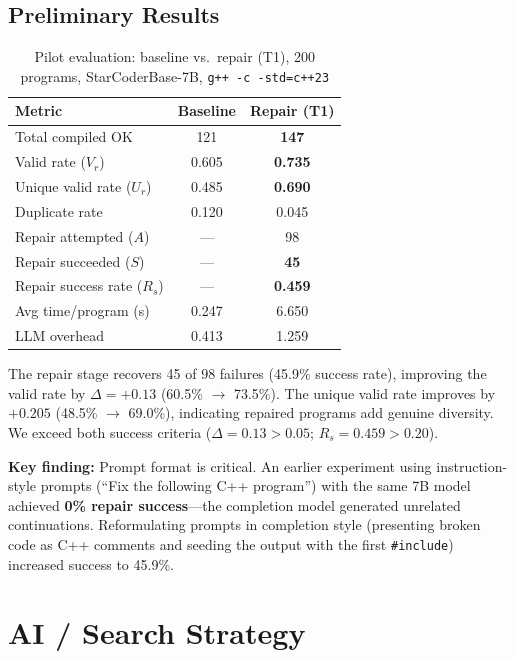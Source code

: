 \documentclass[conference]{IEEEtran}
\begin{document}
\subsection{Preliminary Results}
\label{sec:prelim}

\begin{table}[t]
\centering
\caption{Pilot evaluation: baseline vs.\ repair (T1), 200 programs, StarCoderBase-7B, \texttt{g++ -c -std=c++23}}
\label{tab:main_results}
\begin{tabular}{lcc}
\toprule
\textbf{Metric} & \textbf{Baseline} & \textbf{Repair (T1)} \\
\midrule
Total compiled OK & 121 & \textbf{147} \\
Valid rate ($V_r$) & 0.605 & \textbf{0.735} \\
Unique valid rate ($U_r$) & 0.485 & \textbf{0.690} \\
Duplicate rate & 0.120 & 0.045 \\
\midrule
Repair attempted ($A$) & --- & 98 \\
Repair succeeded ($S$) & --- & \textbf{45} \\
Repair success rate ($R_s$) & --- & \textbf{0.459} \\
\midrule
Avg time/program (s) & 0.247 & 6.650 \\
LLM overhead & 0.413 & 1.259 \\
\bottomrule
\end{tabular}
\end{table}

The repair stage recovers 45 of 98 failures (45.9\% success rate), improving the valid rate by $\Delta = +0.13$ (60.5\% $\to$ 73.5\%). The unique valid rate improves by $+0.205$ (48.5\% $\to$ 69.0\%), indicating repaired programs add genuine diversity. We exceed both success criteria ($\Delta = 0.13 > 0.05$; $R_s = 0.459 > 0.20$).

\textbf{Key finding:} Prompt format is critical. An earlier experiment using instruction-style prompts (``Fix the following C++ program'') with the same 7B model achieved \textbf{0\% repair success}---the completion model generated unrelated continuations. Reformulating prompts in completion style (presenting broken code as C++ comments and seeding the output with the first \texttt{\#include}) increased success to 45.9\%.

\section{AI / Search Strategy}
\end{document}
